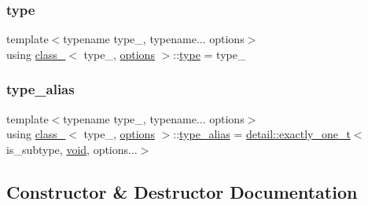 \mbox{\label{classclass___a90e08a4ecffb596c1f1055f47747ad91}} 
\subsubsection{\texorpdfstring{type}{type}}
{\footnotesize\ttfamily template$<$typename type\+\_\+, typename... options$>$ \\
using \mbox{\hyperlink{classclass__}{class\+\_\+}}$<$ type\+\_\+, \mbox{\hyperlink{classoptions}{options}} $>$\+::\mbox{\hyperlink{classclass___a90e08a4ecffb596c1f1055f47747ad91}{type}} =  type\+\_\+}

\mbox{\label{classclass___a18716f57a4db37eb2e5482309e5253c4}} 
\subsubsection{\texorpdfstring{type\_alias}{type\_alias}}
{\footnotesize\ttfamily template$<$typename type\+\_\+, typename... options$>$ \\
using \mbox{\hyperlink{classclass__}{class\+\_\+}}$<$ type\+\_\+, \mbox{\hyperlink{classoptions}{options}} $>$\+::\mbox{\hyperlink{classclass___a18716f57a4db37eb2e5482309e5253c4}{type\+\_\+alias}} =  \mbox{\hyperlink{detail_2common_8h_a9ec2c72f4073efb0fb0bd007b0616f0a}{detail\+::exactly\+\_\+one\+\_\+t}}$<$is\+\_\+subtype, \mbox{\hyperlink{_s_d_l__opengles2__gl2ext_8h_ae5d8fa23ad07c48bb609509eae494c95}{void}}, options...$>$}



\subsection{Constructor \& Destructor Documentation}
\mbox{\label{classclass___a0c0ddf3d9d90319b5ca87ebdcac4cf28}} 
